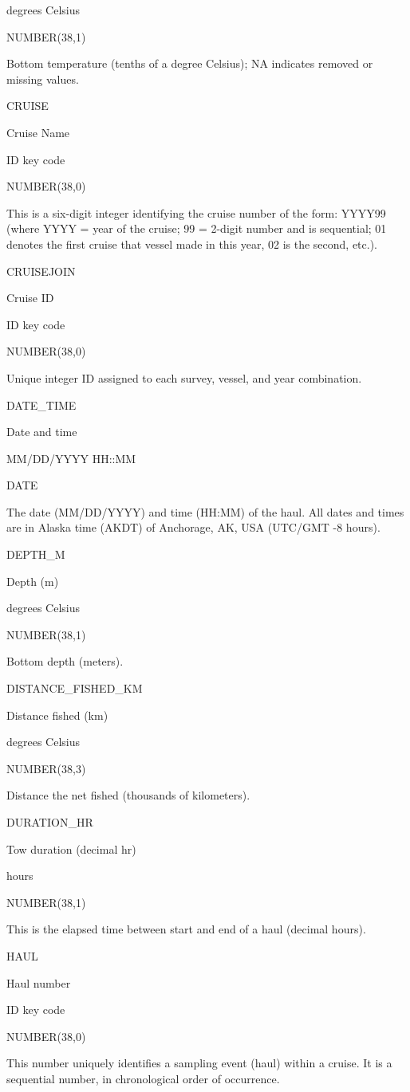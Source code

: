 \documentclass[
  letterpaper,
  oneside,
  open=any]{scrbook}
\begin{document}
degrees Celsius

NUMBER(38,1)

Bottom temperature (tenths of a degree Celsius); NA indicates removed or
missing values.

CRUISE

Cruise Name

ID key code

NUMBER(38,0)

This is a six-digit integer identifying the cruise number of the form:
YYYY99 (where YYYY = year of the cruise; 99 = 2-digit number and is
sequential; 01 denotes the first cruise that vessel made in this year,
02 is the second, etc.).

CRUISEJOIN

Cruise ID

ID key code

NUMBER(38,0)

Unique integer ID assigned to each survey, vessel, and year combination.

DATE\_TIME

Date and time

MM/DD/YYYY HH::MM

DATE

The date (MM/DD/YYYY) and time (HH:MM) of the haul. All dates and times
are in Alaska time (AKDT) of Anchorage, AK, USA (UTC/GMT -8 hours).

DEPTH\_M

Depth (m)

degrees Celsius

NUMBER(38,1)

Bottom depth (meters).

DISTANCE\_FISHED\_KM

Distance fished (km)

degrees Celsius

NUMBER(38,3)

Distance the net fished (thousands of kilometers).

DURATION\_HR

Tow duration (decimal hr)

hours

NUMBER(38,1)

This is the elapsed time between start and end of a haul (decimal
hours).

HAUL

Haul number

ID key code

NUMBER(38,0)

This number uniquely identifies a sampling event (haul) within a cruise.
It is a sequential number, in chronological order of occurrence.
\end{document}
